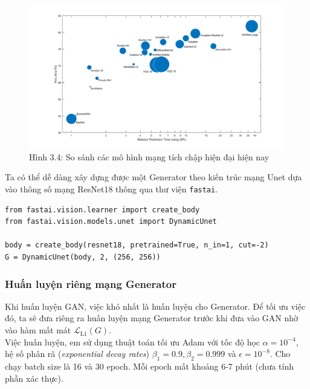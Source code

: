 \documentclass[a4paper]{article}
\begin{document}
\begin{figure}[h!]
\centering
\includegraphics[width=14.4cm]{images/3_4.png}
\caption{Hình 3.4: So sánh các mô hình mạng tích chập hiện đại hiện nay}
\end{figure}

\noindent
Ta có thể dễ dàng xây dựng được một Generator theo kiến trúc mạng Unet dựa vào thông số mạng ResNet18 thông qua thư viện \texttt{fastai}.
\begin{lstlisting}
from fastai.vision.learner import create_body
from fastai.vision.models.unet import DynamicUnet

body = create_body(resnet18, pretrained=True, n_in=1, cut=-2)
G = DynamicUnet(body, 2, (256, 256))
\end{lstlisting}

\subsubsection{Huấn luyện riêng mạng Generator}
Khi huấn luyện GAN, việc khó nhất là huấn luyện cho Generator. Để tối ưu việc đó, ta sẽ đưa riêng ra huấn luyện mạng Generator trước khi đưa vào GAN nhờ vào hàm mất mát $\mathcal{L}_{\text{L1}}(G)$.\\

\noindent
Việc huấn luyện, em sử dụng thuật toán tối ưu Adam với tốc độ học $\alpha =  10^{-4}$, hệ số phân rã (\textit{exponential decay rates}) $\beta_1 = 0.9, \beta_2 = 0.999$ và $\epsilon = 10^{-8}$. Cho chạy batch size là 16 và 30 epoch. Mỗi epoch mất khoảng 6-7 phút (chưa tính phần xác thực).
\end{document}
